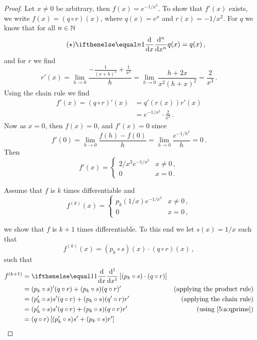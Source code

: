 \documentclass[week=6]{homework}
\begin{document}
\begin{questions}
\begin{parts}
\begin{proof}
	    		Let $x \neq 0$ be arbitrary, then $f(x) = e^{-1/x^2}$. To show that $f'(x)$ exists, we write $f(x) = (q\circ r)(x)$, where $q(x) = e^x$ and $r(x) = -1/x^2$.
	    		For $q$ we know that for all $n \in \mathbb{N}$
	    		\begin{equation} \label{5:a:qprime} \tag{$\star$}
		    		\diff[x][n]{}q(x) = q(x)\,,
	    		\end{equation}
	    		and for $r$ we find
	    		\[
		    		r'(x) = \lim_{h\to 0} \frac{-\frac{1}{(x+h)^2} + \frac{1}{x^2}}{h} = \lim_{h\to 0} \frac{h+2x}{x^2 (h+x)^2} = \frac{2}{x^3}\,.
	    		\]
	    		Using the chain rule we find
	    		\begin{align*}
	    			f'(x) = (q \circ r)'(x) &= q'(r(x))r'(x) \\
		    			&= e^{-1/x^2}\cdot\frac{2}{x^3}\,.
	    		\end{align*}
	    		Now as $x=0$, then $f(x) = 0$, and $f'(x) = 0$ since
	    		\[
		    		f'(0) = \lim_{h \to 0} \frac{f(h) - f(0)}{h} = \lim_{h \to 0} \frac{e^{-1/h^2}}{h} = 0\,.
	    		\]
	    		Then
	    		\[
		    		f'(x) = \begin{cases} 2/x^3e^{-1/x^2} & x\neq 0\,, \\ 0 & x = 0\,. \end{cases}
	    		\]
	    		
	    		Assume that $f$ is $k$ times differentiable and
	    		\[
		    		f^{(k)}(x) = \begin{cases} p_k(1/x)e^{-1/x^2} & x\neq 0\,, \\ 0 & x = 0\,, \end{cases}
	    		\]
	    		
	    		we show that $f$ is $k+1$ times differentiable. To this end we let $s(x) = 1/x$ such that
	    		\[
		    		f^{(k)}(x) = (p_k \circ s)(x)\cdot (q\circ r)(x)\,,
		    	\]
		    	such that
		    	\begin{align*}
		    		f^{(k+1)} &= \diff{} \left[(p_k \circ s)\cdot(q\circ r)\right] \\
		    		&= (p_k \circ s)'(q\circ r) + (p_k \circ s)(q\circ r)' & \mbox{(applying the product rule)} \\
		    		&= (p_k' \circ s)s' (q\circ r) + (p_k \circ s)(q' \circ r)r' & \mbox{(applying the chain rule)} \\
		    		&= (p_k' \circ s)s' (q\circ r) + (p_k \circ s)(q\circ r)r' & \mbox{(using \ref{5:a:qprime})} \\
		    		&= (q\circ r)\left[ (p_k' \circ s)s'  + (p_k \circ s)r' \right]\\
		    	\end{align*}
		    	

\end{proof}
\end{parts}
\end{questions}
\end{document}
